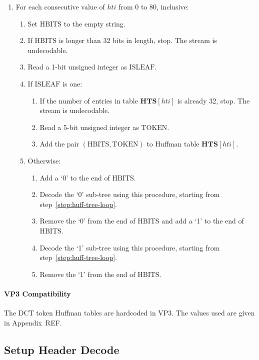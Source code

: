 \documentclass[11pt,letterpaper]{book}
\newcommand{\idx}[1]{{\ensuremath{\mathit{#1}}}}
\newcommand{\hti}{\idx{hti}}
\newcommand{\bitvar}[1]{\ensuremath{\mathbf{\bm #1}}}
\newcommand{\locvar}[1]{\ensuremath{\mathrm{#1}}}
\numberwithin{equation}{chapter}
\numberwithin{figure}{chapter}
\numberwithin{table}{chapter}
\begin{document}
\begin{enumerate}
\item
For each consecutive value of \locvar{\hti} from $0$ to $80$, inclusive:
\begin{enumerate}
\item
Set \locvar{HBITS} to the empty string.
\item
\label{step:huff-tree-loop}
If \locvar{HBITS} is longer than 32 bits in length, stop.
The stream is undecodable.
\item
Read a 1-bit unsigned integer as \locvar{ISLEAF}.
\item
If \locvar{ISLEAF} is one:
\begin{enumerate}
\item
If the number of entries in table $\bitvar{HTS}[\locvar{\hti}]$ is already 32,
 stop.
The stream is undecodable.
\item
Read a 5-bit unsigned integer as \locvar{TOKEN}.
\item
Add the pair $(\locvar{HBITS},\locvar{TOKEN})$ to Huffman table
 $\bitvar{HTS}[\locvar{\hti}]$.
\end{enumerate}
\item
Otherwise:
\begin{enumerate}
\item
Add a `0' to the end of \locvar{HBITS}.
\item
Decode the `0' sub-tree using this procedure, starting from
 step~\ref{step:huff-tree-loop}.
\item
Remove the `0' from the end of \locvar{HBITS} and add a `1' to the end of
 \locvar{HBITS}.
\item
Decode the `1' sub-tree using this procedure, starting from
 step~\ref{step:huff-tree-loop}.
\item
Remove the `1' from the end of \locvar{HBITS}.
\end{enumerate}
\end{enumerate}
\end{enumerate}

\paragraph{VP3 Compatibility}

The DCT token Huffman tables are hardcoded in VP3.
The values used are given in Appendix~REF.

\subsection{Setup Header Decode}
\end{document}
